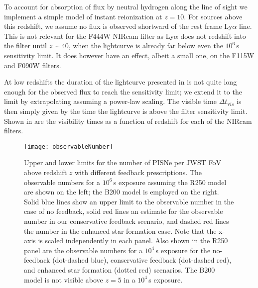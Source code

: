 \documentclass[../thesis.tex]{subfiles}
\begin{document}
To account for absorption of flux by neutral hydrogen along the line
of sight we implement a simple model of instant reionization at
$z=10$.  For sources above this redshift, we assume no flux is
observed shortward of the rest frame Ly$\alpha$ line.  This is not
relevant for the F444W NIRcam filter as Ly$\alpha$ does not redshift
into the filter until $z\sim40$, when the lightcurve is already far
below even the $10^6\,$s sensitivity limit.  It does however have an
effect, albeit a small one, on the F115W and F090W filters.

At low redshifts the duration of the lightcurve presented in
\citet{KasenWoosleyHeger2011} is not quite long enough for the
observed flux to reach the sensitivity limit; we extend it to the
limit by extrapolating assuming a power-law scaling.  The visible time
$\Delta t_{\mathrm vis}$ is then simply given by the time the lightcurve
is above the filter sensitivity limit.  Shown in 
are the visibility times as a function of redshift for each of the
NIRcam filters.  

\begin{figure}
 \begin{center}
   \texttt{[image: observableNumber]}
   \caption{Upper and lower limits for the number of
     PISNe per JWST FoV above redshift $z$ with different feedback
     prescriptions. The observable numbers for a $10^6\,$s exposure
     assuming the R250 model are shown on the left; the B200 model is
     employed on the right. Solid blue lines show an upper limit to
     the observable number in the case of no feedback, solid red lines
     an estimate for the observable number in our conservative
     feedback scenario, and dashed red lines the number in the
     enhanced star formation case. Note that the x-axis is scaled
     independently in each panel.  Also shown in the R250 panel are
     the observable numbers for a $10^4\,$s exposure for the
     no-feedback (dot-dashed blue), conservative feedback (dot-dashed
     red), and enhanced star formation (dotted red) scenarios. The
     B200 model is not visible above $z=5$ in a $10^4\,$s exposure.}
   \label{obsnumber}
 \end{center}
\end{figure} 
\end{document}
